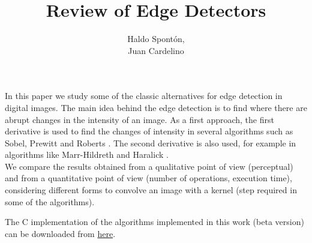 \documentclass{ipol}
\numberwithin{equation}{section}
\numberwithin{table}{section}
\numberwithin{figure}{section}
\begin{document}


\title{Review of Edge Detectors}
\author{Haldo Spont\'on,\\
        Juan Cardelino}
\date{}
\ipolMaketitle

\begin{ipolAbstract}
In this paper we study some of the classic alternatives for edge detection in digital images. The main idea 
behind the edge detection is to find where there are abrupt changes in the intensity of an image. 
As a first approach, the first derivative is used to find the changes of intensity in several algorithms 
such as Sobel, Prewitt and Roberts \cite{Gonzalez2007Digital}. The second derivative is also used, for example in algorithms 
like Marr-Hildreth \cite{AIM-518} and Haralick \cite{bb20239}.\\
We compare the results obtained from a qualitative point of view (perceptual) and from a quantitative 
point of view (number of operations, execution time), considering different forms to convolve an 
image with a kernel (step required in some of the algorithms).\\


\end{ipolAbstract}

\begin{ipolCode}
The C implementation of the algorithms implemented in this work (beta version) can be
downloaded from \href{http://iie.fing.edu.uy/~haldos/downloads/edge_detectors_v0.1.tar.gz}{here}.
\end{ipolCode}
\end{document}
